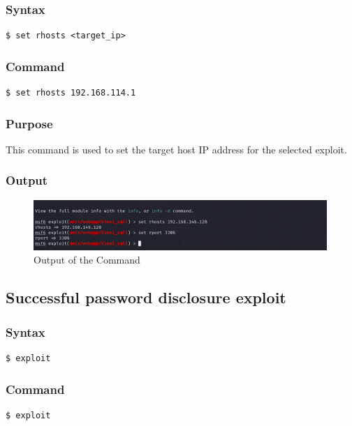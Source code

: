 \documentclass[11pt]{article}
\begin{document}
\subsubsection*{Syntax}
\begin{verbatim}
$ set rhosts <target_ip>
\end{verbatim}

\subsubsection*{Command}
\begin{verbatim}
$ set rhosts 192.168.114.1
\end{verbatim}

\subsubsection*{Purpose}
This command is used to set the target host IP address for the selected exploit.

\subsubsection*{Output}

\begin{figure}[H]
    \centering
    \includegraphics[width=0.99\textwidth]{a3_ss (25).png}
    \caption{Output of the Command}
\end{figure}
\subsection{Successful password disclosure exploit}

\subsubsection*{Syntax}
\begin{verbatim}
$ exploit
\end{verbatim}

\subsubsection*{Command}
\begin{verbatim}
$ exploit
\end{verbatim}
\end{document}
